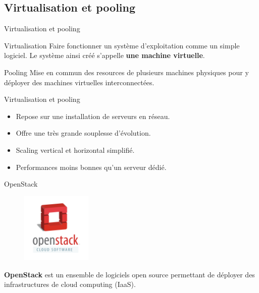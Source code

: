 \documentclass{beamer}
\begin{document}
\subsection{Virtualisation et pooling}

\begin{frame}{Virtualisation et pooling}
    \begin{block}{Virtualisation}
        \pause
        Faire fonctionner un système d'exploitation comme un simple logiciel.
        Le système ainsi créé s'appelle \textbf{une machine virtuelle}.
    \end{block}
    \pause
    \begin{block}{Pooling}
        \pause
        Mise en commun des resources de plusieurs machines physiques pour y
        déployer des machines virtuelles interconnectées.
    \end{block}
\end{frame}

\begin{frame}{Virtualisation et pooling}
    \begin{itemize}
        \item {
        Repose sur une installation de serveurs en réseau.
        }\pause
        \item {
        Offre une très grande souplesse d'évolution.
        }\pause
        \item {
        Scaling vertical et horizontal simplifié.
        }\pause
        \item {
        Performances moins bonnes qu'un serveur dédié.
        }\pause
    \end{itemize}
\end{frame}

\begin{frame}{OpenStack}
    \begin{figure}[h]
        \includegraphics[width=0.30\textwidth]{images/openstack-logo.png}
    \end{figure}
    \textbf{OpenStack} est un ensemble de logiciels open source permettant de déployer des infrastructures de cloud computing (IaaS).
\end{frame}
\end{document}
